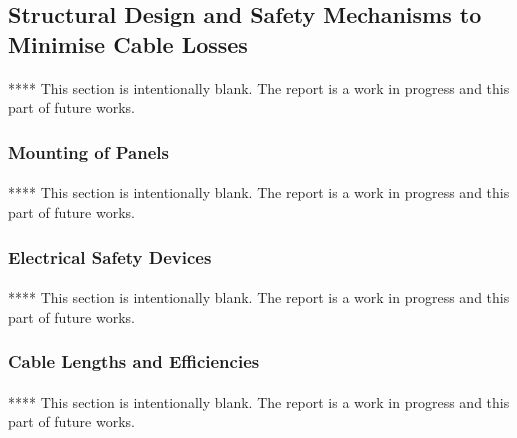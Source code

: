 \subsection{Structural Design and Safety Mechanisms to Minimise Cable Losses}

\paragraph{}
****
\newline
This section is intentionally blank. The report is a work in progress and this part of future works.  

\subsubsection{Mounting of Panels}

\paragraph{}
****
\newline
This section is intentionally blank. The report is a work in progress and this part of future works.  

\subsubsection{Electrical Safety Devices}

\paragraph{}
****
\newline
This section is intentionally blank. The report is a work in progress and this part of future works.  

\subsubsection{Cable Lengths and Efficiencies}

\paragraph{}
****
\newline
This section is intentionally blank. The report is a work in progress and this part of future works.  